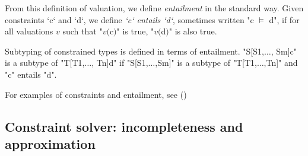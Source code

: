 From this definition of valuation, we define {\em entailment} in the standard
way.  Given constraints \xcd`c` and \xcd`d`, we define {\em \xcd`c` entails
\xcd`d`}, sometimes written \xcdmath"c $\models$ d", if for all valuations
{$v$} such that \xcdmath"$v($c$)$" is true, \xcdmath"$v($d$)$" is also true. 

Subtyping of constrained types is defined in terms of entailment. 
\xcdmath"S[S1,$\ldots$, Sm]{c}" 
is a subtype of 
\xcdmath"T[T1,$\ldots$, Tn]{d}" 
if \xcdmath"S[S1,$\ldots$,Sm]" is a subtype of \xcdmath"T[T1,$\ldots$,Tn]" and
\xcd"c" entails \xcd"d".

For examples of constraints and entailment, see ()


\subsection{Constraint solver: incompleteness and approximation}



